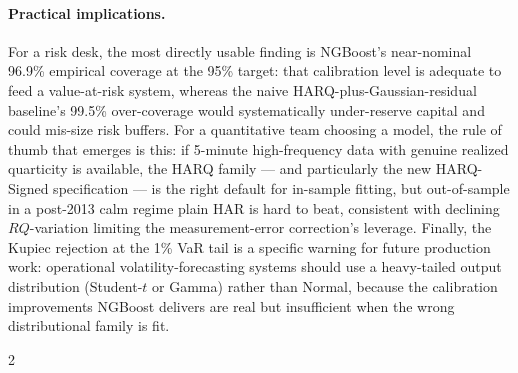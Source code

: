 \documentclass[10pt,letterpaper]{article}
\begin{document}
\paragraph{Practical implications.} For a risk desk, the most directly usable finding is NGBoost's near-nominal 96.9\% empirical coverage at the 95\% target: that calibration level is adequate to feed a value-at-risk system, whereas the naive HARQ-plus-Gaussian-residual baseline's 99.5\% over-coverage would systematically under-reserve capital and could mis-size risk buffers. For a quantitative team choosing a model, the rule of thumb that emerges is this: if 5-minute high-frequency data with genuine realized quarticity is available, the HARQ family --- and particularly the new HARQ-Signed specification --- is the right default for in-sample fitting, but out-of-sample in a post-2013 calm regime plain HAR is hard to beat, consistent with declining $RQ$-variation limiting the measurement-error correction's leverage. Finally, the Kupiec rejection at the 1\% VaR tail is a specific warning for future production work: operational volatility-forecasting systems should use a heavy-tailed output distribution (Student-$t$ or Gamma) rather than Normal, because the calibration improvements NGBoost delivers are real but insufficient when the wrong distributional family is fit.

\footnotesize
\setlength{\bibsep}{1pt plus 0.3ex}
\begin{multicols}{2}


\end{multicols}
\end{document}
